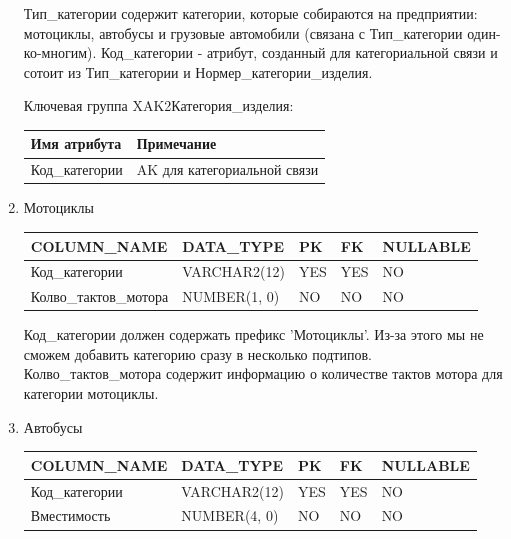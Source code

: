 \begin{enumerate}
    Тип\_категории содержит категории, которые собираются на предприятии: мотоциклы, автобусы и грузовые автомобили (связана с Тип\_категории один-ко-многим).
    Код\_категории - атрибут, созданный для категориальной связи и сотоит из Тип\_категории и Нормер\_категории\_изделия.

    Ключевая группа XAK2Категория\_изделия:

    \begin{tabular}{|p{7cm}|p{9.3cm}|} \hline

        {\bf Имя атрибута} & {\bf Примечание} \\ \hline
        Код\_категории & AK для категориальной связи \\ \hline

    \end{tabular}

    \item{Мотоциклы}

    \begin{tabular}{|p{7cm}|p{3cm}|p{1cm}|p{1cm}|p{3cm}|} \hline

        {\bf COLUMN\_NAME} & {\bf DATA\_TYPE} & {\bf PK} & {\bf FK} & {\bf NULLABLE} \\ \hline
        Код\_категории & VARCHAR2(12) & YES & YES & NO \\ \hline
        Колво\_тактов\_мотора & NUMBER(1, 0) & NO & NO & NO \\ \hline

    \end{tabular}

    Код\_категории должен содержать префикс 'Мотоциклы'. Из-за этого мы не сможем добавить категорию сразу в несколько подтипов.
    Колво\_тактов\_мотора содержит информацию о количестве тактов мотора для категории мотоциклы.

    \item{Автобусы}

    \begin{tabular}{|p{7cm}|p{3cm}|p{1cm}|p{1cm}|p{3cm}|} \hline

        {\bf COLUMN\_NAME} & {\bf DATA\_TYPE} & {\bf PK} & {\bf FK} & {\bf NULLABLE} \\ \hline
        Код\_категории & VARCHAR2(12) & YES & YES & NO \\ \hline
        Вместимость & NUMBER(4, 0) & NO & NO & NO \\ \hline

    \end{tabular}


\end{enumerate}
